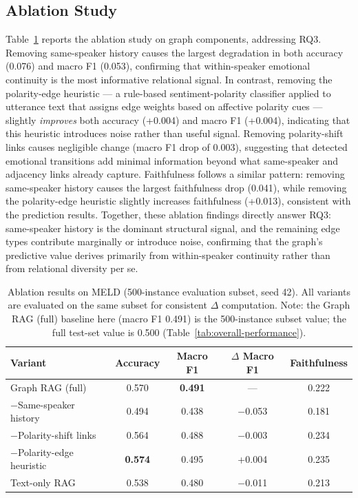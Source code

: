 \documentclass[runningheads]{llncs}
\begin{document}
\subsection{Ablation Study}
\label{sec:ablation}

Table~\ref{tab:ablation} reports the ablation study on graph components,
addressing RQ3. Removing same-speaker history causes the largest
degradation in both accuracy (0.076) and macro F1 (0.053), confirming
that within-speaker emotional continuity is the most informative
relational signal. In contrast, removing the polarity-edge heuristic --- a rule-based sentiment-polarity classifier applied to utterance text that assigns edge weights based on affective polarity cues --- slightly
\emph{improves} both accuracy (+0.004) and macro F1 (+0.004),
indicating that this heuristic introduces noise rather than useful signal. Removing polarity-shift links causes negligible change
(macro F1 drop of 0.003), suggesting that detected emotional transitions
add minimal information beyond what same-speaker and adjacency links
already capture. Faithfulness follows a similar pattern: removing
same-speaker history causes the largest faithfulness drop (0.041),
while removing the polarity-edge heuristic slightly increases faithfulness (+0.013),
consistent with the prediction results. Together, these ablation findings
directly answer RQ3: same-speaker history is the dominant structural signal,
and the remaining edge types contribute marginally or introduce noise, confirming
that the graph's predictive value derives primarily from within-speaker continuity
rather than from relational diversity per se.

\begin{table}
\centering
\caption{Ablation results on MELD (500-instance evaluation subset, seed 42).
All variants are evaluated on the same subset for consistent $\Delta$ computation.
Note: the Graph RAG (full) baseline here (macro F1 0.491) is the 500-instance
subset value; the full test-set value is 0.500 (Table~\ref{tab:overall-performance}).}
\label{tab:ablation}
\begin{tabular}{lcccc}
\toprule
Variant & Accuracy & Macro F1 & $\Delta$ Macro F1 & Faithfulness \\
\midrule
Graph RAG (full)        & 0.570 & \textbf{0.491} & --- & 0.222 \\
$-$Same-speaker history & 0.494 & 0.438 & $-$0.053 & 0.181 \\
$-$Polarity-shift links & 0.564 & 0.488 & $-$0.003 & 0.234 \\
$-$Polarity-edge heuristic  & \textbf{0.574} & 0.495 & +0.004 & 0.235 \\
\midrule
Text-only RAG           & 0.538 & 0.480 & $-$0.011 & 0.213 \\
\bottomrule
\end{tabular}
\end{table}
\end{document}
